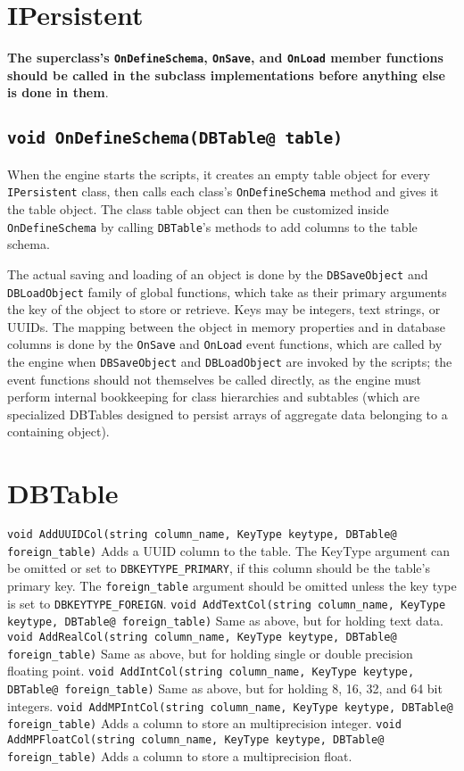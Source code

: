 \documentclass{book}
\begin{document}
\section{IPersistent}

\textbf{The superclass's \texttt{OnDefineSchema}, \texttt{OnSave}, and
  \texttt{OnLoad} member functions should be called in the subclass
  implementations before anything else is done in them}.


\subsection{\texttt{void OnDefineSchema(DBTable@ table)}}
When the engine starts the scripts, it creates an empty table object for every
\texttt{IPersistent} class, then calls each class's \texttt{OnDefineSchema}
method and gives it the table object. The class table object can then be
customized inside \texttt{OnDefineSchema} by calling \texttt{DBTable}'s methods
to add columns to the table schema.


The actual saving and loading of an object is done by the \texttt{DBSaveObject}
and \texttt{DBLoadObject} family of global functions, which take as their
primary arguments the key of the object to store or retrieve. Keys may be
integers, text strings, or UUIDs. The mapping between the object in memory
properties and in database columns is done by the \texttt{OnSave} and
\texttt{OnLoad} event functions, which are called by the engine when
\texttt{DBSaveObject} and \texttt{DBLoadObject} are invoked by the scripts; the
event functions should not themselves be called directly, as the engine must
perform internal bookkeeping for class hierarchies and subtables (which are
specialized DBTables designed to persist arrays of aggregate data belonging to a
containing object).



\section{DBTable}
\texttt{void AddUUIDCol(string column\_name, KeyType keytype, DBTable@ foreign\_table)}
  Adds a UUID column to the table. The KeyType argument can be omitted or set to
\texttt{DBKEYTYPE\_PRIMARY}, if this column should be the table's primary key. The \texttt{foreign\_table}
  argument should be omitted unless the key type is set to \texttt{DBKEYTYPE\_FOREIGN}.
\texttt{void AddTextCol(string column\_name, KeyType keytype, DBTable@ foreign\_table)}
  Same as above, but for holding text data.
\texttt{void AddRealCol(string column\_name, KeyType keytype, DBTable@ foreign\_table)}
  Same as above, but for holding single or double precision floating point.
\texttt{void AddIntCol(string column\_name, KeyType keytype, DBTable@ foreign\_table)}
  Same as above, but for holding 8, 16, 32, and 64 bit integers.
\texttt{void AddMPIntCol(string column\_name, KeyType keytype, DBTable@ foreign\_table)}
  Adds a column to store an multiprecision integer.
\texttt{void AddMPFloatCol(string column\_name, KeyType keytype, DBTable@ foreign\_table)}
  Adds a column to store a multiprecision float.
\end{document}
